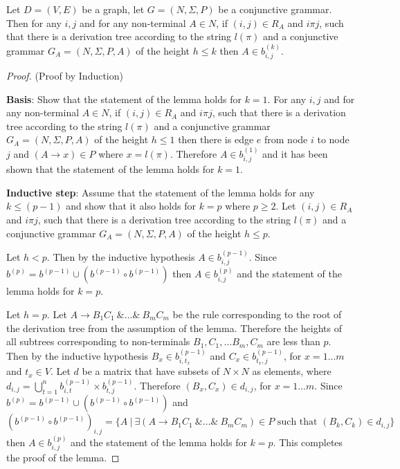 \begin{lemma}\label{lemma:conj}
	Let $D = (V,E)$ be a graph, let $G =(N,\Sigma,P)$ be a conjunctive grammar. Then for any $i, j$ and for any non-terminal $A \in N$, if $(i,j) \in R_A$ and $i \pi j$, such that there is a derivation tree according to the string $l(\pi)$ and a conjunctive grammar $G_A = (N,\Sigma,P,A)$ of the height $h \leq k$ then $A \in b^{(k)}_{i,j}$.
\end{lemma}
\begin{proof}(Proof by Induction)
	
	\textbf{Basis}: Show that the statement of the lemma holds for $k = 1$. For any $i, j$ and for any non-terminal $A \in N$, if $(i,j) \in R_A$ and $i \pi j$, such that there is a derivation tree according to the string $l(\pi)$ and a conjunctive grammar $G_A = (N,\Sigma,P,A)$ of the height $h \leq 1$ then there is edge $e$ from node $i$ to node $j$ and $(A \rightarrow x) \in P$ where $x = l(\pi)$. Therefore $A \in b^{(1)}_{i,j}$ and it has been shown that the statement of the lemma holds for $k = 1$.
	
	\textbf{Inductive step}: Assume that the statement of the lemma holds for any $k \leq (p - 1)$ and show that it also holds for $k = p$ where $p \geq 2$. Let $(i,j) \in R_A$ and $i \pi j$, such that there is a derivation tree according to the string $l(\pi)$ and a conjunctive grammar $G_A = (N,\Sigma,P,A)$ of the height $h \leq p$.
	
	Let $h < p$. Then by the inductive hypothesis $A \in b^{(p-1)}_{i,j}$. Since $b^{(p)} = b^{(p-1)} \cup (b^{(p-1)} \circ b^{(p-1)})$ then $A \in b^{(p)}_{i,j}$ and the statement of the lemma holds for $k = p$.
	
	Let $h = p$. Let $A \rightarrow B_1 C_1~\& \ldots \&~B_m C_m$ be the rule corresponding to the root of the derivation tree from the assumption of the lemma. Therefore the heights of all subtrees corresponding to non-terminals $B_1, C_1, \ldots B_m, C_m$ are less than $p$. Then by the inductive hypothesis $B_x \in b^{(p-1)}_{i,t_x}$ and $C_x \in b^{(p-1)}_{t_x,j}$, for $x = 1\ldots m$ and $t_x \in V$. Let $d$ be a matrix that have subsets of $N \times N$ as elements, where $d_{i,j} = \bigcup^{n}_{t=1}{b^{(p-1)}_{i,t} \times b^{(p-1)}_{t,j}}$. Therefore $(B_x, C_x) \in d_{i,j}$, for $x = 1\ldots m$. Since $b^{(p)} = b^{(p-1)} \cup (b^{(p-1)} \circ b^{(p-1)})$ and $(b^{(p-1)} \circ b^{(p-1)})_{i,j} = \{A~|~\exists (A \rightarrow B_1 C_1~\& \ldots \&~B_m C_m) \in P \text{ such that } (B_k, C_k) \in d_{i,j} \}$ then $A \in b^{(p)}_{i,j}$ and the statement of the lemma holds for $k = p$. This completes the proof of the lemma.
\end{proof}


